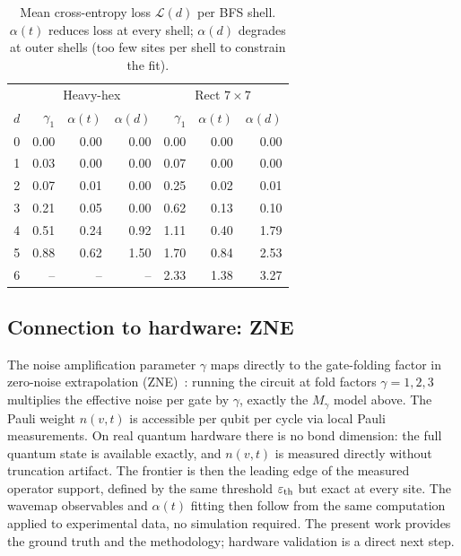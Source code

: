 \documentclass[letterpaper]{article}
\begin{document}
\begin{table}[t]
\centering
\setlength{\tabcolsep}{3pt}
\scriptsize
\begin{tabular}{r|rrr|rrr}
\toprule
 & \multicolumn{3}{c|}{Heavy-hex} & \multicolumn{3}{c}{Rect $7\times7$} \\
$d$ & $\gamma_1$ & $\alpha(t)$ & $\alpha(d)$ & $\gamma_1$ & $\alpha(t)$ & $\alpha(d)$ \\
\midrule
0 & 0.00 & 0.00 & 0.00 & 0.00 & 0.00 & 0.00 \\
1 &    0.03 & 0.00 &    0.00 &    0.07 & 0.00 &    0.00 \\
2 &    0.07 & 0.01 &    0.00 &    0.25 & 0.02 &    0.01 \\
3 &    0.21 & 0.05 &    0.00 &    0.62 & 0.13 &    0.10 \\
4 &    0.51 & 0.24 &    0.92 &    1.11 & 0.40 &    1.79 \\
5 &    0.88 & 0.62 &    1.50 &    1.70 & 0.84 &    2.53 \\
6 &     --  &  --  &    --   &    2.33 & 1.38 &    3.27 \\
\bottomrule
\end{tabular}
\caption{Mean cross-entropy loss $\mathcal{L}(d)$ per BFS shell.
$\alpha(t)$ reduces loss at every shell; $\alpha(d)$ degrades at
outer shells (too few sites per shell to constrain the fit).}
\label{tab:ld}
\end{table}

\subsection{Connection to hardware: ZNE}

The noise amplification parameter $\gamma$ maps directly to the
gate-folding factor in zero-noise extrapolation
(ZNE)~\cite{giurgica2020digital}: running the circuit at fold factors
$\gamma=1,2,3$ multiplies the effective noise per gate by $\gamma$,
exactly the $M_\gamma$ model above.
The Pauli weight $n(v,t)$ is accessible per qubit per cycle via local
Pauli measurements.
On real quantum hardware there is no bond dimension: the full quantum
state is available exactly, and $n(v,t)$ is measured directly without
truncation artifact. The frontier is then the leading edge of the
measured operator support, defined by the same threshold
$\varepsilon_{\rm th}$ but exact at every site.
The wavemap observables and $\alpha(t)$ fitting then follow from the
same computation applied to experimental data, no simulation required.
The present work provides the ground truth and the methodology;
hardware validation is a direct next step.
\end{document}
